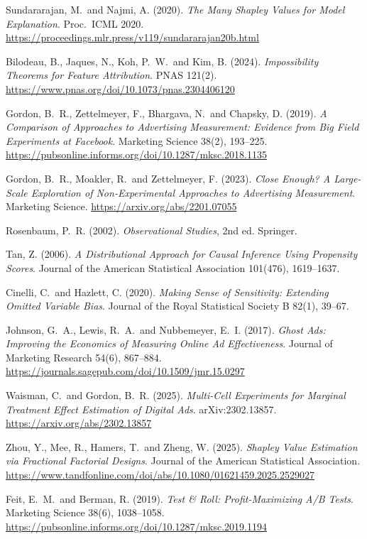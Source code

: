 \begin{enumerate}[label={[\arabic*]},leftmargin=2.5em]
\item Sundararajan, M.\ and Najmi, A. (2020). \emph{The Many Shapley Values for Model Explanation}. Proc.\ ICML 2020. \url{https://proceedings.mlr.press/v119/sundararajan20b.html}
\item Bilodeau, B., Jaques, N., Koh, P.\ W.\ and Kim, B. (2024). \emph{Impossibility Theorems for Feature Attribution}. PNAS 121(2). \url{https://www.pnas.org/doi/10.1073/pnas.2304406120}
\item Gordon, B.\ R., Zettelmeyer, F., Bhargava, N.\ and Chapsky, D. (2019). \emph{A Comparison of Approaches to Advertising Measurement: Evidence from Big Field Experiments at Facebook}. Marketing Science 38(2), 193--225. \url{https://pubsonline.informs.org/doi/10.1287/mksc.2018.1135}
\item Gordon, B.\ R., Moakler, R.\ and Zettelmeyer, F. (2023). \emph{Close Enough? A Large-Scale Exploration of Non-Experimental Approaches to Advertising Measurement}. Marketing Science. \url{https://arxiv.org/abs/2201.07055}
\item Rosenbaum, P.\ R. (2002). \emph{Observational Studies}, 2nd ed. Springer.
\item Tan, Z. (2006). \emph{A Distributional Approach for Causal Inference Using Propensity Scores}. Journal of the American Statistical Association 101(476), 1619--1637.
\item Cinelli, C.\ and Hazlett, C. (2020). \emph{Making Sense of Sensitivity: Extending Omitted Variable Bias}. Journal of the Royal Statistical Society B 82(1), 39--67.
\item Johnson, G.\ A., Lewis, R.\ A.\ and Nubbemeyer, E.\ I. (2017). \emph{Ghost Ads: Improving the Economics of Measuring Online Ad Effectiveness}. Journal of Marketing Research 54(6), 867--884. \url{https://journals.sagepub.com/doi/10.1509/jmr.15.0297}
\item Waisman, C.\ and Gordon, B.\ R. (2025). \emph{Multi-Cell Experiments for Marginal Treatment Effect Estimation of Digital Ads}. arXiv:2302.13857. \url{https://arxiv.org/abs/2302.13857}
\item Zhou, Y., Mee, R., Hamers, T.\ and Zheng, W. (2025). \emph{Shapley Value Estimation via Fractional Factorial Designs}. Journal of the American Statistical Association. \url{https://www.tandfonline.com/doi/abs/10.1080/01621459.2025.2529027}
\item Feit, E.\ M.\ and Berman, R. (2019). \emph{Test \& Roll: Profit-Maximizing A/B Tests}. Marketing Science 38(6), 1038--1058. \url{https://pubsonline.informs.org/doi/10.1287/mksc.2019.1194}

\end{enumerate}
